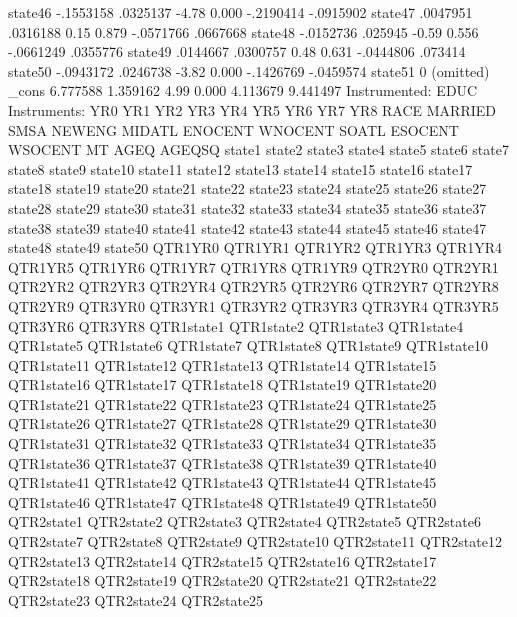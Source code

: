      state46 {\VBAR}  -.1553158   .0325137    -4.78   0.000    -.2190414   -.0915902
     state47 {\VBAR}   .0047951   .0316188     0.15   0.879    -.0571766    .0667668
     state48 {\VBAR}  -.0152736    .025945    -0.59   0.556    -.0661249    .0355776
     state49 {\VBAR}   .0144667   .0300757     0.48   0.631    -.0444806     .073414
     state50 {\VBAR}  -.0943172   .0246738    -3.82   0.000    -.1426769   -.0459574
     state51 {\VBAR}          0  (omitted)
       _cons {\VBAR}   6.777588   1.359162     4.99   0.000     4.113679    9.441497
Instrumented:  EDUC
Instruments:   YR0 YR1 YR2 YR3 YR4 YR5 YR6 YR7 YR8 RACE MARRIED SMSA NEWENG
               MIDATL ENOCENT WNOCENT SOATL ESOCENT WSOCENT MT AGEQ AGEQSQ
               state1 state2 state3 state4 state5 state6 state7 state8
               state9 state10 state11 state12 state13 state14 state15
               state16 state17 state18 state19 state20 state21 state22
               state23 state24 state25 state26 state27 state28 state29
               state30 state31 state32 state33 state34 state35 state36
               state37 state38 state39 state40 state41 state42 state43
               state44 state45 state46 state47 state48 state49 state50
               QTR1YR0 QTR1YR1 QTR1YR2 QTR1YR3 QTR1YR4 QTR1YR5 QTR1YR6
               QTR1YR7 QTR1YR8 QTR1YR9 QTR2YR0 QTR2YR1 QTR2YR2 QTR2YR3
               QTR2YR4 QTR2YR5 QTR2YR6 QTR2YR7 QTR2YR8 QTR2YR9 QTR3YR0
               QTR3YR1 QTR3YR2 QTR3YR3 QTR3YR4 QTR3YR5 QTR3YR6 QTR3YR8
               QTR1state1 QTR1state2 QTR1state3 QTR1state4 QTR1state5
               QTR1state6 QTR1state7 QTR1state8 QTR1state9 QTR1state10
               QTR1state11 QTR1state12 QTR1state13 QTR1state14 QTR1state15
               QTR1state16 QTR1state17 QTR1state18 QTR1state19 QTR1state20
               QTR1state21 QTR1state22 QTR1state23 QTR1state24 QTR1state25
               QTR1state26 QTR1state27 QTR1state28 QTR1state29 QTR1state30
               QTR1state31 QTR1state32 QTR1state33 QTR1state34 QTR1state35
               QTR1state36 QTR1state37 QTR1state38 QTR1state39 QTR1state40
               QTR1state41 QTR1state42 QTR1state43 QTR1state44 QTR1state45
               QTR1state46 QTR1state47 QTR1state48 QTR1state49 QTR1state50
               QTR2state1 QTR2state2 QTR2state3 QTR2state4 QTR2state5
               QTR2state6 QTR2state7 QTR2state8 QTR2state9 QTR2state10
               QTR2state11 QTR2state12 QTR2state13 QTR2state14 QTR2state15
               QTR2state16 QTR2state17 QTR2state18 QTR2state19 QTR2state20
               QTR2state21 QTR2state22 QTR2state23 QTR2state24 QTR2state25
